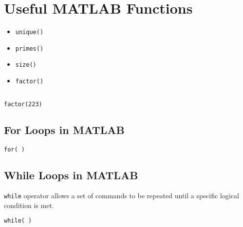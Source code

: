 \section{Useful MATLAB Functions}

\begin{itemize}
\item \texttt{unique()}
\item \texttt{primes()}
\item \texttt{size()}
\item \texttt{factor()}
\end{itemize}
\begin{framed}
\begin{verbatim}

factor(223)

\end{verbatim}
\end{framed}


\subsection{For Loops in MATLAB}
\begin{framed}
\begin{verbatim}
for( )

\end{verbatim}
\end{framed}
\subsection{While Loops in MATLAB}
\texttt{while} operator allows a set of commands to be repeated until a specific logical condition is met.

\begin{framed}
\begin{verbatim}
while( )

\end{verbatim}
\end{framed}

